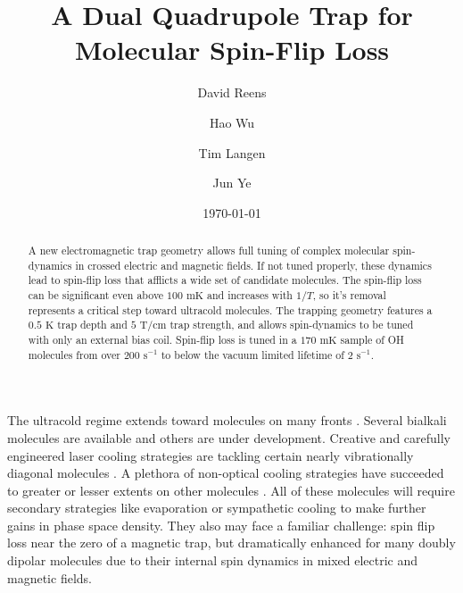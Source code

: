 \documentclass[%
 reprint,
 amsmath,amssymb,
 aps,
prl,
]{revtex4-1}
\begin{document}

\title{A Dual Quadrupole Trap for Molecular Spin-Flip Loss}%


\author{David Reens}%
\author{Hao Wu}
\author{Tim Langen}%
\author{Jun Ye}
%

\date{\today}%


\begin{abstract}
A new electromagnetic trap geometry allows full tuning of complex molecular spin-dynamics in crossed electric and magnetic fields. If not tuned properly, these dynamics lead to spin-flip loss that afflicts a wide set of candidate molecules. The spin-flip loss can be significant even above $100\text{ mK}$ and increases with $1/T$, so it's removal represents a critical step toward ultracold molecules. The trapping geometry features a $0.5 \text{ K}$ trap depth and $5 \text{ T/cm}$ trap strength, and allows spin-dynamics to be tuned with only an external bias coil. Spin-flip loss is tuned in a $170 \text{ mK}$ sample of OH molecules from over $200 \text{ s}^{-1} $ to below the vacuum limited lifetime of $2 \text{ s}^{-1}$.
\end{abstract}


\maketitle


%
%
The ultracold regime extends toward molecules on many fronts \cite{Carr2009}. Several bialkali molecules are available \cite{Ni2008, Takekoshi2014, Park2015} and others are under development. Creative and carefully engineered laser cooling strategies are tackling certain nearly vibrationally diagonal molecules \cite{Steinecker2016, Barry2014, Hemmerling2016, Hummon2013, Zhelyazkova2014}. A plethora of non-optical cooling strategies have succeeded to greater or lesser extents on other molecules \cite{Doyle1998,Prehn2016,Bethlem1999,Bochinski2003,Akerman2015}. All of these molecules will require secondary strategies like evaporation or sympathetic cooling to make further gains in phase space density. They also may face a familiar challenge: spin flip loss near the zero of a magnetic trap, but dramatically enhanced for many doubly dipolar molecules due to their internal spin dynamics in mixed electric and magnetic fields. 
\end{document}
